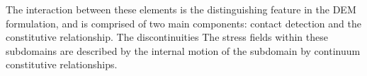 
The interaction between these elements is the distinguishing feature in the DEM formulation, and is comprised of two main components: contact detection and the constitutive relationship. The discontinuities The stress fields within these subdomains are described by the internal motion of the subdomain by continuum constitutive relationships.  